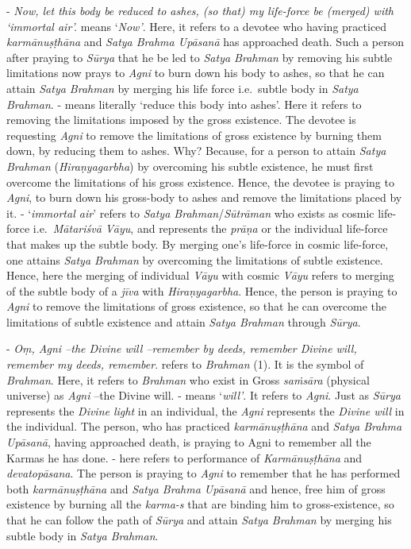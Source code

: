 - \emph{Now, let this body be reduced to ashes, (so that) my life-force be (merged) with `immortal air'.}  means `\emph{Now'}. Here, it refers to a devotee who having practiced \emph{karmānuṣṭhāna} and \emph{Satya Brahma Upāsanā} has approached death. Such a person after praying to \emph{Sūrya} that he be led to \emph{Satya Brahman} by removing his subtle limitations now prays to \emph{Agni} to burn down his body to ashes, so that he can attain \emph{Satya Brahman} by merging his life force i.e.\ subtle body in \emph{Satya Brahman}. - means literally `reduce this body into ashes'. Here it refers to removing the limitations imposed by the gross existence. The devotee is requesting \emph{Agni} to remove the limitations of gross existence by burning them down, by reducing them to ashes. Why? Because, for a person to attain \emph{Satya Brahman} (\emph{Hiraṇyagarbha}) by overcoming his subtle existence, he must first overcome the limitations of his gross existence. Hence, the devotee is praying to \emph{Agni}, to burn down his gross-body to ashes and remove the limitations placed by it. - `\emph{immortal air}' refers to \emph{Satya Brahman}/\emph{Sūtrāman} who exists as cosmic life-force i.e.\ \emph{Mātariśvā Vāyu}, and  represents the \emph{prāṇa} or the individual life-force that makes up the subtle body. By merging one's life-force in cosmic life-force, one attains \emph{Satya Brahman} by overcoming the limitations of subtle existence. Hence, here the merging of individual \emph{Vāyu} with cosmic \emph{Vāyu} refers to merging of the subtle body of a \emph{jīva} with \emph{Hiraṇyagarbha}. Hence, the person is praying to \emph{Agni} to remove the limitations of gross existence, so that he can overcome the limitations of subtle existence and attain \emph{Satya Brahman} through \emph{Sūrya}.

- \emph{Oṃ, Agni --the Divine will --remember by deeds, remember Divine will, remember my deeds, remember}.  refers to \emph{Brahman} (1). It is the symbol of \emph{Brahman}. Here, it refers to \emph{Brahman} who exist in Gross \emph{saṁsāra} (physical universe) as \emph{Agni} --the Divine will. - means `\emph{will'}. It refers to \emph{Agni}. Just as \emph{Sūrya} represents the \emph{Divine light} in an individual, the \emph{Agni} represents the \emph{Divine will} in the individual. The person, who has practiced \emph{karmānuṣṭhāna} and \emph{Satya Brahma Upāsanā}, having approached death, is praying to Agni to remember all the Karmas he has done. - here refers to performance of \emph{Karmānuṣṭhāna} and \emph{devatopāsana}. The person is praying to \emph{Agni} to remember that he has performed both \emph{karmānuṣṭhāna} and \emph{Satya Brahma Upāsanā} and hence, free him of gross existence by burning all the \emph{karma-s} that are binding him to gross-existence, so that he can follow the path of \emph{Sūrya} and attain \emph{Satya Brahman} by merging his subtle body in \emph{Satya Brahman}.

